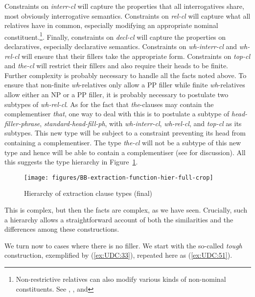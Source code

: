 \documentclass[output=paper
,notxmath 
 	        ,biblatex
                ,babelshorthands
                ,newtxmath
                ,draftmode
                ,colorlinks, citecolor=brown
]{langscibook}
\begin{document}
\noindent
Constraints on \emph{interr-cl} will capture the properties that all
interrogatives share, most obviously interrogative semantics.
Constraints on \emph{rel-cl} will capture what all relatives have in
common, especially modifying an appropriate nominal
constituent.\footnote{Non-restrictive relatives can also modify various
  kinds of non-nominal constituents. See ,
  , and
  }.%
Finally, constraints on \emph{decl-cl}
will capture the properties on declaratives, especially declarative
semantics.  Constraints on \emph{wh-interr-cl} and \emph{wh-rel-cl}
will ensure that their fillers take the appropriate form. Constraints
on \emph{top-cl} and \emph{the-cl} will restrict their fillers and
also require their heads to be finite. Further complexity is probably
necessary to handle all the facts noted above. To ensure that
non-finite \emph{wh}-relatives only allow a PP filler while finite
\emph{wh}-relatives allow either an NP or a PP filler, it is probably
necessary to postulate two subtypes of \emph{wh-rel-cl}. As for the
fact that \emph{the}-clauses may contain the complementiser
\emph{that}, one way to deal with this is to postulate a subtype of
\emph{head-filler-phrase}, \emph{standard-head-fill-ph}, with
\emph{wh-interr-cl}, \emph{wh-rel-cl}, and \emph{top-cl} as its
subtypes. This new type will be subject to a constraint preventing its
head from containing a complementiser. The type \emph{the-cl} will not
be a subtype of this new type and hence will be able to contain a
complementiser (see \citealt[13--15]{Borsley:11} for discussion). All this suggests
the type hierarchy in Figure~\ref{fig:UDC:50}. 
%
\begin{figure}
  \centering
  \texttt{[image: figures/BB-extraction-function-hier-full-crop]}
  \caption{\label{fig:UDC:50}Hierarchy of extraction clause types (final)}
  
\end{figure}
%
%
This is complex, but then the facts are complex, as we have seen.
Crucially, such a hierarchy allows a straightforward account of both the
similarities and the differences among these constructions.
\label{udc:page-correlatives-end}

We\label{udc:page-no-filler-start} turn now to cases where there is no filler. We start with the
so-called \emph{tough} construction, exemplified by (\ref{ex:UDC:33}), repeated here as
(\ref{ex:UDC:51}).
\end{document}
